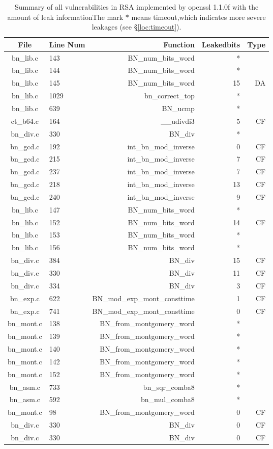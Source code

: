 \begin{table*}%
\centering
\caption{Summary of all vulnerabilities in RSA implemented by openssl 1.1.0f with the amount of leak informationThe mark $*$ means timeout,which indicates more severe leakages (see \S\ref{loc:timeout}).}\label{tab:RSAopenssl}
\begin{tabular}{clrrr}
\hline
\textbf{File} & \textbf{Line Num} & \textbf{Function} & \textbf{Leakedbits} & \textbf{Type} \\\hline
bn\_lib.c& 143&BN\_num\_bits\_word&*&\\
bn\_lib.c& 144&BN\_num\_bits\_word&*&\\
bn\_lib.c& 145&BN\_num\_bits\_word&15&DA\\
bn\_lib.c& 1029&bn\_correct\_top&*&\\
bn\_lib.c& 639&BN\_ucmp&*&\\
ct\_b64.c& 164&\_\_udivdi3&5 &CF\\
bn\_div.c& 330&BN\_div&*&\\
bn\_gcd.c& 192&int\_bn\_mod\_inverse&0 &CF\\
bn\_gcd.c& 215&int\_bn\_mod\_inverse&7 &CF\\
bn\_gcd.c& 237&int\_bn\_mod\_inverse&7 &CF\\
bn\_gcd.c& 218&int\_bn\_mod\_inverse&13&CF\\
bn\_gcd.c& 240&int\_bn\_mod\_inverse&9 &CF\\
bn\_lib.c& 147&BN\_num\_bits\_word&*&\\
bn\_lib.c& 152&BN\_num\_bits\_word&14&CF\\
bn\_lib.c& 153&BN\_num\_bits\_word&*&\\
bn\_lib.c& 156&BN\_num\_bits\_word&*&\\
bn\_div.c& 384&BN\_div&15&CF\\
bn\_div.c& 330&BN\_div&11&CF\\
bn\_div.c& 334&BN\_div&3 &CF\\
bn\_exp.c& 622&BN\_mod\_exp\_mont\_consttime&1 &CF\\
bn\_exp.c& 741&BN\_mod\_exp\_mont\_consttime&0 &CF\\
bn\_mont.c& 138&BN\_from\_montgomery\_word&*&\\
bn\_mont.c& 139&BN\_from\_montgomery\_word&*&\\
bn\_mont.c& 140&BN\_from\_montgomery\_word&*&\\
bn\_mont.c& 142&BN\_from\_montgomery\_word&*&\\
bn\_mont.c& 152&BN\_from\_montgomery\_word&*&\\
bn\_asm.c& 733&bn\_sqr\_comba8&*&\\
bn\_asm.c& 592&bn\_mul\_comba8&*&\\
bn\_mont.c& 98&BN\_from\_montgomery\_word&0 &CF\\
bn\_div.c& 330&BN\_div&0 &CF\\
bn\_div.c& 330&BN\_div&0 &CF\\
\hline
\end{tabular}
\end{table*}